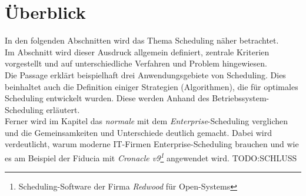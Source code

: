 \section{Überblick}
In den folgenden Abschnitten wird das Thema Scheduling näher betrachtet. \\
Im Abschnitt  wird dieser Ausdruck allgemein definiert, zentrale Kriterien vorgestellt und auf unterschiedliche Verfahren und Problem hingewiesen.\\
Die Passage  erklärt beispielhaft drei Anwendungsgebiete von Scheduling. Dies beinhaltet auch die Definition einiger Strategien (Algorithmen), die für optimales Scheduling entwickelt wurden. Diese werden Anhand des Betriebssystem-Scheduling erläutert. \\
Ferner wird im Kapitel  das \textit{normale} mit dem \textit{Enterprise}-Scheduling verglichen und die Gemeinsamkeiten und Unterschiede deutlich gemacht.  Dabei wird verdeutlicht, warum moderne IT-Firmen Enterprise-Scheduling brauchen und wie es am Beispiel der \ac{Fiducia} mit \textit{Cronacle v9\footnote{Scheduling-Software der Firma \textit{Redwood} für Open-Systems}} angewendet wird. 
TODO:SCHLUSS
